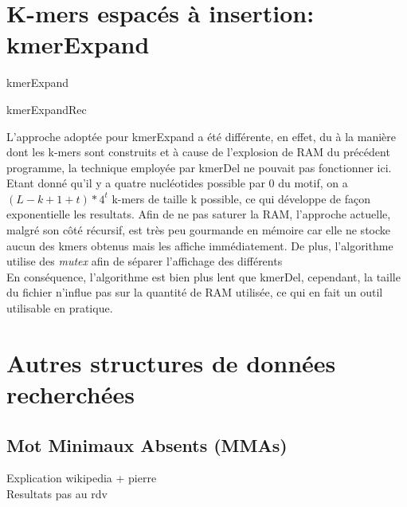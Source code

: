 \documentclass{report}
\begin{document}
  \chapter{K-mers espacés à insertion: kmerExpand}
    \normalsize
    \begin{algorithm}[H]{
      \caption{kmerExpand}
    }\end{algorithm}
    \begin{algorithm}[H]{
      \caption{kmerExpandRec}
    }\end{algorithm}
    \large
    L'approche adoptée pour kmerExpand a été différente, en effet, du à la manière dont les k-mers sont construits et à cause de l'explosion de RAM du précédent programme, la technique employée par kmerDel ne pouvait pas fonctionner ici.\\
    Etant donné qu'il y a quatre nucléotides possible par $0$ du motif, on a $(L - k + 1 + t)*4^t$ k-mers de taille k possible, ce qui développe de façon exponentielle les resultats. Afin de ne pas saturer la RAM, l'approche actuelle, malgré son côté récursif, est très peu gourmande en mémoire car elle ne stocke aucun des kmers obtenus mais les affiche immédiatement. De plus, l'algorithme utilise des \textit{mutex} afin de séparer l'affichage des différents \\
    En conséquence, l'algorithme est bien plus lent que kmerDel, cependant, la taille du fichier n'influe pas sur la quantité de RAM utilisée, ce qui en fait un outil utilisable en pratique.
    \newpage
  \chapter{Autres structures de données recherchées}
    \section{Mot Minimaux Absents (MMAs)}
      Explication wikipedia + pierre\\
      Resultats pas au rdv
\end{document}

